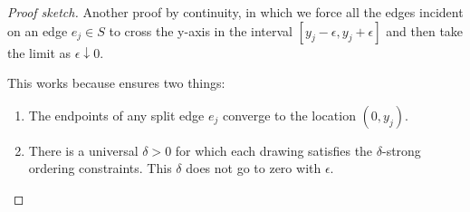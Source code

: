 \documentclass{patmorin}
\begin{document}
\begin{proof}[Proof sketch]
   Another proof by continuity, in which we force all the edges
   incident on an edge $e_j\in S$ to cross the y-axis in the
   interval $[y_j-\epsilon,y_j+\epsilon]$ and then take the limit as
   $\epsilon\downarrow 0$.

   This works because  ensures two things:
   \begin{enumerate}
     \item The endpoints of any split edge $e_j$ converge to the location $(0,y_j)$.
     \item There is a universal $\delta >0$ for which each drawing satisfies the  $\delta$-strong ordering constraints. This $\delta$ does not go to zero with $\epsilon$.
   \end{enumerate}
\end{proof}


%
%
%
%
\end{document}
